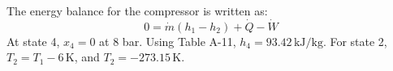 The energy balance for the compressor is written as:  
\[
0 = \dot{m}(h_1 - h_2) + \dot{Q} - \dot{W}
\]  
At state 4, \( x_4 = 0 \) at 8 bar. Using Table A-11, \( h_4 = 93.42 \, \text{kJ/kg} \).  
For state 2, \( T_2 = T_1 - 6 \, \text{K} \), and \( T_2 = -273.15 \, \text{K} \).
